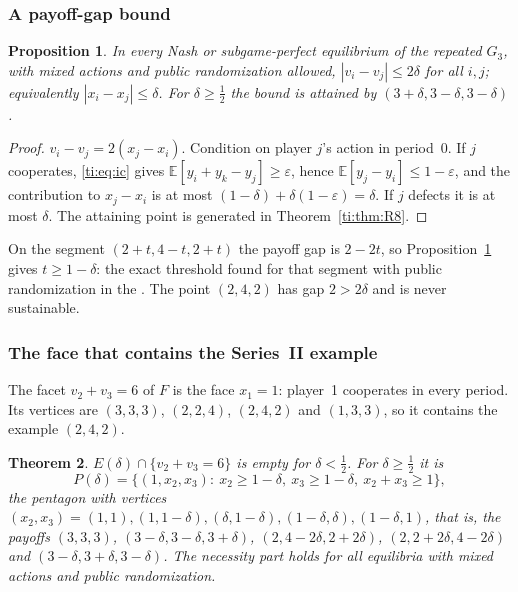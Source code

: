 \documentclass[11pt]{amsart}
\newtheorem{theorem}{Theorem}[section]
\newtheorem{proposition}[theorem]{Proposition}
\theoremstyle{remark}
\begin{document}
\subsubsection{A payoff-gap bound}

\begin{proposition}\label{ti:prop:R9}
In every Nash or subgame-perfect equilibrium of the repeated $G_3$, with mixed actions and public
randomization allowed, $|v_i-v_j|\le2\delta$ for all $i,j$; equivalently $|x_i-x_j|\le\delta$.
For $\delta\ge\frac12$ the bound is attained by $(3+\delta,3-\delta,3-\delta)$.
\end{proposition}

\begin{proof}
$v_i-v_j=2(x_j-x_i)$. Condition on player $j$'s action in period~0. If $j$ cooperates,
\eqref{ti:eq:ic} gives $\mathbb E[y_i+y_k-y_j]\ge\varepsilon$, hence $\mathbb E[y_j-y_i]\le1-\varepsilon$,
and the contribution to $x_j-x_i$ is at most $(1-\delta)+\delta(1-\varepsilon)=\delta$. If $j$
defects it is at most $\delta$. The attaining point is generated in Theorem~\ref{ti:thm:R8}.
\end{proof}

On the segment $(2+t,4-t,2+t)$ the payoff gap is $2-2t$, so Proposition~\ref{ti:prop:R9} gives
$t\ge1-\delta$: the exact threshold found for that segment with public randomization in the
\cite[Proposition~4]{v1}. The point $(2,4,2)$ has gap $2>2\delta$ and is never sustainable.

\subsubsection{The face that contains the Series~II example}

The facet $v_2+v_3=6$ of $F$ is the face $x_1=1$: player~1 cooperates in every period. Its
vertices are $(3,3,3)$, $(2,2,4)$, $(2,4,2)$ and $(1,3,3)$, so it contains the example $(2,4,2)$.

\begin{theorem}\label{ti:thm:R2}
$E(\delta)\cap\{v_2+v_3=6\}$ is empty for $\delta<\frac12$. For $\delta\ge\frac12$ it is
\[
  P(\delta)=\bigl\{(1,x_2,x_3):\ x_2\ge1-\delta,\ x_3\ge1-\delta,\ x_2+x_3\ge1\bigr\},
\]
the pentagon with vertices $(x_2,x_3)=(1,1),(1,1-\delta),(\delta,1-\delta),(1-\delta,\delta),(1-\delta,1)$,
that is, the payoffs $(3,3,3)$, $(3-\delta,3-\delta,3+\delta)$, $(2,4-2\delta,2+2\delta)$,
$(2,2+2\delta,4-2\delta)$ and $(3-\delta,3+\delta,3-\delta)$. The necessity part holds for all
equilibria with mixed actions and public randomization.
\end{theorem}
\end{document}
